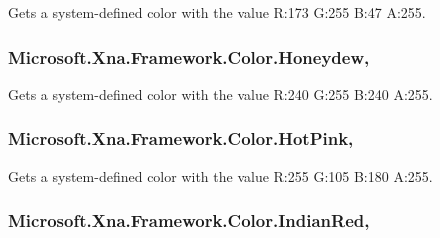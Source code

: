 Gets a system-\/defined color with the value R\+:173 G\+:255 B\+:47 A\+:255.

\hypertarget{struct_microsoft_1_1_xna_1_1_framework_1_1_color_a6dcb4365bf25d4ccbffc7c378b11a453}{}
\subsubsection[{Honeydew}]{ Microsoft.\+Xna.\+Framework.\+Color.\+Honeydew\hspace{0.3cm}{\ttfamily [static]}, {\ttfamily [get]}}\label{struct_microsoft_1_1_xna_1_1_framework_1_1_color_a6dcb4365bf25d4ccbffc7c378b11a453}


Gets a system-\/defined color with the value R\+:240 G\+:255 B\+:240 A\+:255.

\hypertarget{struct_microsoft_1_1_xna_1_1_framework_1_1_color_a3fafff23ce6f9973148598f2181ed0d6}{}
\subsubsection[{Hot\+Pink}]{ Microsoft.\+Xna.\+Framework.\+Color.\+Hot\+Pink\hspace{0.3cm}{\ttfamily [static]}, {\ttfamily [get]}}\label{struct_microsoft_1_1_xna_1_1_framework_1_1_color_a3fafff23ce6f9973148598f2181ed0d6}


Gets a system-\/defined color with the value R\+:255 G\+:105 B\+:180 A\+:255.

\hypertarget{struct_microsoft_1_1_xna_1_1_framework_1_1_color_a8341ec9f16f4841ffdd2641b039abd77}{}
\subsubsection[{Indian\+Red}]{ Microsoft.\+Xna.\+Framework.\+Color.\+Indian\+Red\hspace{0.3cm}{\ttfamily [static]}, {\ttfamily [get]}}\label{struct_microsoft_1_1_xna_1_1_framework_1_1_color_a8341ec9f16f4841ffdd2641b039abd77}



